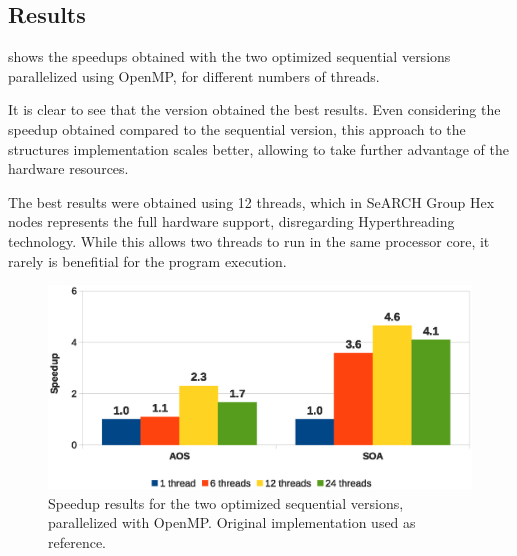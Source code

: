  \subsection{Results}

 shows the speedups obtained with the two optimized sequential versions parallelized using OpenMP, for different numbers of threads.

It is clear to see that the \soa version obtained the best results. Even considering the speedup obtained compared to the sequential \aos version, this approach to the structures implementation scales better, allowing to take further advantage of the hardware resources.

The best results were obtained using 12 threads, which in SeARCH Group Hex nodes represents the full hardware support, disregarding \intel Hyperthreading technology. While this allows two threads to run in the same processor core, it rarely is benefitial for the program execution.

\begin{figure}[!htp]
	\centering
	\includegraphics[width=\columnwidth]{images/graph_comparison_omp.eps}
	\caption{Speedup results for the two optimized sequential versions, parallelized with OpenMP. Original implementation used as reference.}
	\label{fig:results:omp}
\end{figure}